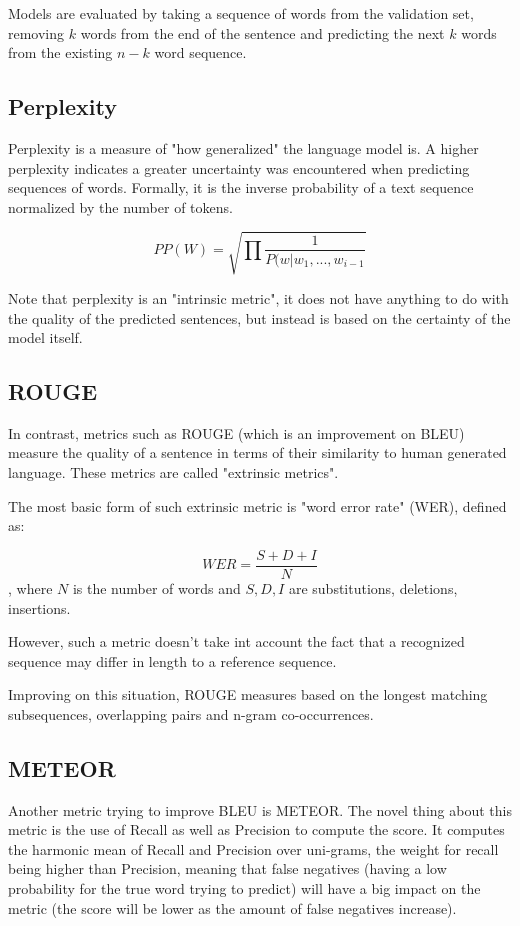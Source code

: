 \documentclass[a4paper]{article}
\begin{document}
Models are evaluated by taking a sequence
of words from the validation set, removing
$k$ words from the end of the sentence and predicting
the next $k$ words from the existing $n - k$ word sequence.

\subsection{Perplexity}
\label{sec:perplexity}

Perplexity is a measure of "how generalized" the language
model is. A higher perplexity indicates a greater uncertainty
was encountered when predicting sequences of words. Formally,
it is the inverse probability of a text sequence normalized
by the number of tokens.

$$ PP(W) = \sqrt{\prod \frac{1}{P(w|w_1, ..., w_{i - 1}}} $$

Note that perplexity is an "intrinsic metric", it does not
have anything to do with the quality of the predicted
sentences, but instead is based on the certainty of the
model itself.

\subsection{ROUGE}
\label{sec:rouge}

In contrast, metrics such as ROUGE (which is an improvement
on BLEU) measure the quality of a sentence in terms of
their similarity to human generated language. These metrics
are called "extrinsic metrics".

The most basic form of such extrinsic metric is "word error
rate" (WER), defined as:

$$ WER = \frac{S + D + I}{N} $$, where $N$ is the number of
words and $S, D, I$ are substitutions, deletions, insertions.

However, such a metric doesn't take int account the fact that
a recognized sequence may differ in length to a reference
sequence.

Improving on this situation, ROUGE measures based on the
longest matching subsequences, overlapping pairs and n-gram
co-occurrences.

\subsection{METEOR}
\label{sec:meteor}
Another metric trying to improve BLEU is
METEOR. The novel thing about this metric is the use of Recall as well as
Precision to compute the score. It computes the harmonic mean of Recall and
Precision over uni-grams, the weight for recall being higher than Precision,
meaning that false negatives (having a low probability for the true word trying
to predict) will have a big impact on the metric (the score will be lower as the
amount of false negatives increase).
\end{document}
